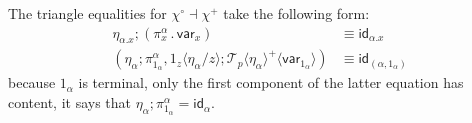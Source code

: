 \documentclass[10pt]{article}
\theoremstyle{definition}
\newcommand\TrPlus[2]{\ensuremath{{#1}^+(#2)}}
\newcommand\TrCirc[2]{\ensuremath{{#1}^\circ(#2)}}
\newcommand\var[1]{\ensuremath{\mathsf{var}_{#1}}}
\newcommand{\id}{\mathsf{id}}
\newcommand\ApEl[2]{\mathcal{T}_{#1}\langle#2\rangle}
\newcommand\ap[2]{\ensuremath{#1 \langle #2 \rangle }}
\newcommand\ApPlus[2]{\ensuremath{{#1}^+ \langle #2 \rangle }}
\newcommand\bdot[0]{\mathbin{.}}
\begin{document}
\noindent The triangle equalities for $\chi^\circ \dashv \chi^+$ take the following form:
\begin{align*}
\eta_{\alpha.x};(\pi_x^\alpha \bdot \var{x}) &\equiv \id_{\alpha.x} \\
(\eta_\alpha ; \pi^\alpha_{1_\alpha}, \ap{1_z}{\eta_\alpha/z} ; \ApPlus{\ApEl{p}{\eta_\alpha}}{\var{1_\alpha}}) &\equiv \id_{(\alpha, 1_\alpha)}
\end{align*}
because $1_\alpha$ is terminal, only the first component of the latter equation has content, it says that $\eta_\alpha ; \pi^\alpha_{1_\alpha} = \id_\alpha$.

\end{document}
